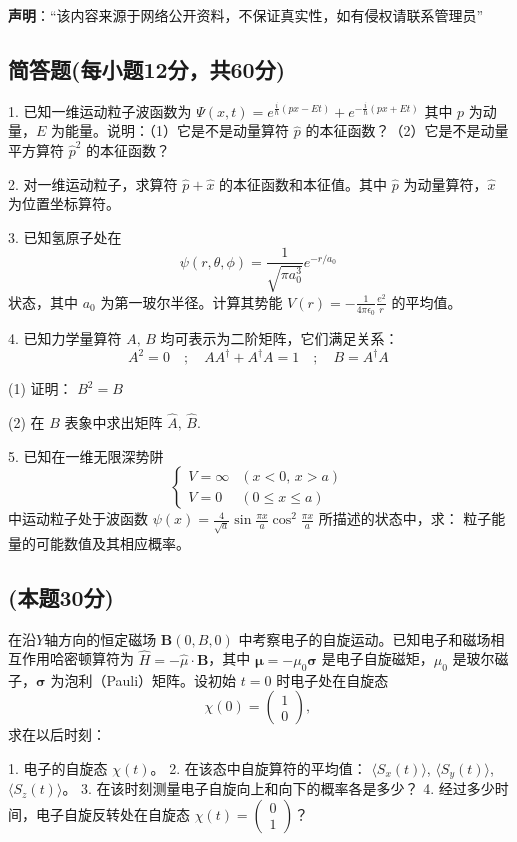 
\textbf{声明}：“该内容来源于网络公开资料，不保证真实性，如有侵权请联系管理员”

\subsection{简答题(每小题12分，共60分)}
1. 已知一维运动粒子波函数为
$ \Psi(x, t) = e^{\frac{i}{\hbar}(px - Et)} + e^{-\frac{i}{\hbar}(px + Et)}$ 
其中 $p$ 为动量，$E$ 为能量。说明：（1）它是不是动量算符 $\hat{p}$ 的本征函数？（2）它是不是动量平方算符 $\hat{p}^2$ 的本征函数？

2. 对一维运动粒子，求算符 $\hat{p} +\hat{x}$ 的本征函数和本征值。其中 $\hat{p}$ 为动量算符，$\hat{x}$ 为位置坐标算符。

3. 已知氢原子处在
$$ \psi(r, \theta, \phi) = \frac{1}{\sqrt{\pi a_0^3}} e^{-r/a_0}~$$ 
状态，其中 $a_0$ 为第一玻尔半径。计算其势能 $V(r) = -\frac{1}{4\pi \epsilon_0} \frac{e^2}{r}$ 的平均值。

4. 已知力学量算符 $A, \, B$ 均可表示为二阶矩阵，它们满足关系：
$$A^2 = 0 \quad ; \quad AA^{\dagger} + A^{\dagger}A = 1 \quad ; \quad B = A^{\dagger}A~$$

(1) 证明： $B^2 = B$

(2) 在 $B$ 表象中求出矩阵 $\hat{A}, \, \hat{B}$.

5. 已知在一维无限深势阱
$$
\begin{cases}
V = \infty & (x < 0, \, x > a) \\
V = 0 & (0 \leq x \leq a)
\end{cases}~
$$
中运动粒子处于波函数 $\psi(x) = \frac{4}{\sqrt{a}} \sin{\frac{\pi x}{a}} \cos^2{\frac{\pi x}{a}}$ 所描述的状态中，求：
粒子能量的可能数值及其相应概率。

\subsection{(本题30分)}
在沿$Y$轴方向的恒定磁场 $\mathbf{B}(0, B, 0)$ 中考察电子的自旋运动。已知电子和磁场相互作用哈密顿算符为 $\hat H = -\hat{\mu} \cdot \mathbf{B}$，其中 $\boldsymbol{\mu} = -\mu_0 \boldsymbol{\sigma}$ 是电子自旋磁矩，$\mu_0$ 是玻尔磁子，$\boldsymbol{\sigma}$ 为泡利（Pauli）矩阵。设初始 $t=0$ 时电子处在自旋态
$$ \chi(0) = \begin{pmatrix} 1 \\ 0 \end{pmatrix},~ $$ 
求在以后时刻：

1. 电子的自旋态 $\chi(t)$。
2. 在该态中自旋算符的平均值： $\langle S_x(t) \rangle$, $\langle S_y(t) \rangle$, $\langle S_z(t) \rangle$。
3. 在该时刻测量电子自旋向上和向下的概率各是多少？
4. 经过多少时间，电子自旋反转处在自旋态 $\chi(t) = \begin{pmatrix} 0 \\ 1 \end{pmatrix}$？
